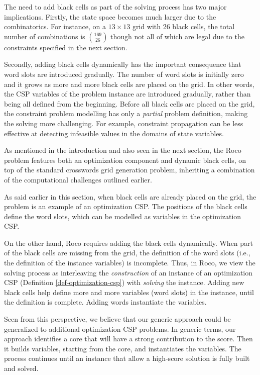 The need to add black cells as part of the solving process has two 
major implications.
Firstly, the state space becomes much larger due to the combinatorics.
For instance, on a $13 \times 13$ grid with $26$
black cells, the total number of combinations is $169 \choose 26$ though
not all of which are legal due to the constraints
specified in the next section.

Secondly, adding black cells dynamically has the important consequence that
word slots are introduced gradually.
The number of word slots is initially zero and it grows
as more and more black cells are placed on the grid.
In other words, the CSP variables of the problem instance are introduced gradually,
rather than being all defined from the beginning.
Before all black cells are placed on the grid, 
the constraint problem modelling has only a \emph{partial} problem definition,
making the solving more challenging.
For example, constraint propagation can be less effective
at detecting infeasible values in the domains of state variables.

As mentioned in the introduction and also seen in the next section, the {\sc Roco} problem features both 
an optimization component and dynamic black cells, on top of the
standard crosswords grid generation problem,
inheriting a combination of 
the computational challenges outlined earlier.

As said earlier in this section,
when black cells are already placed on the grid,
the problem is an example of an optimization CSP.
The positions of the black cells define the word slots,
which can be modelled as variables in the optimization CSP.

On the other hand, {\sc Roco} requires adding the black cells dynamically.
When part of the black cells are missing from the grid, the definition
of the word slots (i.e., the definition of the instance variables) is incomplete.
Thus, in {\sc Roco}, we view the solving process as
interleaving the \emph{construction} of an instance of an optimization CSP
(Definition \ref{def-optimization-csp}) with \emph{solving} the instance.
Adding new black cells help define more and more variables (word slots) in the instance,
until the definition is complete.
Adding words instantiate the variables.

Seen from this perspective, we believe that our generic approach could be generalized
to additional optimization CSP problems. In generic terms, our approach identifies a core
that will have a strong contribution to the score.
Then it builds variables, starting from the core, and instantiates the variables.
The process continues until an instance that allow a high-score solution is fully built and solved.
